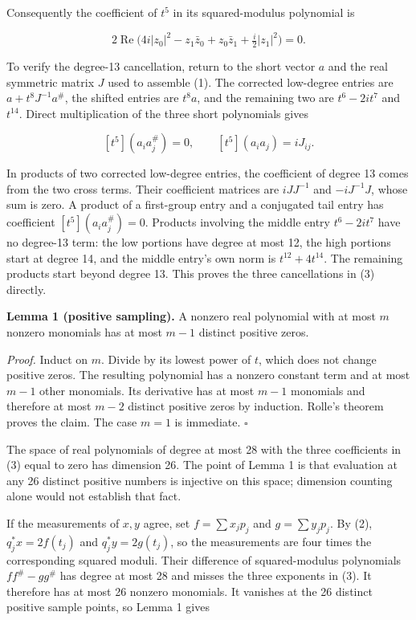 Consequently the coefficient of \(t^5\) in its squared-modulus
polynomial is

\[
2\operatorname{Re}\bigl(4i|z_0|^2-z_1\bar z_0+z_0\bar z_1
+\tfrac i2|z_1|^2\bigr)=0.
\]

To verify the degree-13 cancellation, return to the short vector \(a\)
and the real symmetric matrix \(J\) used to assemble (1). The corrected
low-degree entries are \(a+t^8J^{-1}a^\#\), the shifted entries are
\(t^8a\), and the remaining two are \(t^6-2it^7\) and \(t^{14}\). Direct
multiplication of the three short polynomials gives

\[
[t^5](a_i a_j^\#)=0,\qquad [t^5](a_i a_j)=iJ_{ij}.
\]

In products of two corrected low-degree entries, the coefficient of
degree 13 comes from the two cross terms. Their coefficient matrices are
\(iJJ^{-1}\) and \(-iJ^{-1}J\), whose sum is zero. A product of a
first-group entry and a conjugated tail entry has coefficient
\([t^5](a_i a_j^\#)=0\). Products involving the middle entry
\(t^6-2it^7\) have no degree-13 term: the low portions have degree at
most 12, the high portions start at degree 14, and the middle entry's
own norm is \(t^{12}+4t^{14}\). The remaining products start beyond
degree 13. This proves the three cancellations in (3) directly.

\textbf{Lemma 1 (positive sampling).} A nonzero real polynomial with at
most \(m\) nonzero monomials has at most \(m-1\) distinct positive
zeros.

\emph{Proof.} Induct on \(m\). Divide by its lowest power of \(t\),
which does not change positive zeros. The resulting polynomial has a
nonzero constant term and at most \(m-1\) other monomials. Its
derivative has at most \(m-1\) monomials and therefore at most \(m-2\)
distinct positive zeros by induction. Rolle's theorem proves the claim.
The case \(m=1\) is immediate. \(\square\)

The space of real polynomials of degree at most 28 with the three
coefficients in (3) equal to zero has dimension 26. The point of Lemma 1
is that evaluation at any 26 distinct positive numbers is injective on
this space; dimension counting alone would not establish that fact.

If the measurements of \(x,y\) agree, set \(f=\sum x_jp_j\) and
\(g=\sum y_jp_j\). By (2), \(q_j^*x=2f(t_j)\) and \(q_j^*y=2g(t_j)\), so
the measurements are four times the corresponding squared moduli. Their
difference of squared-modulus polynomials \(ff^\#-gg^\#\) has degree at
most 28 and misses the three exponents in (3). It therefore has at most
26 nonzero monomials. It vanishes at the 26 distinct positive sample
points, so Lemma 1 gives

